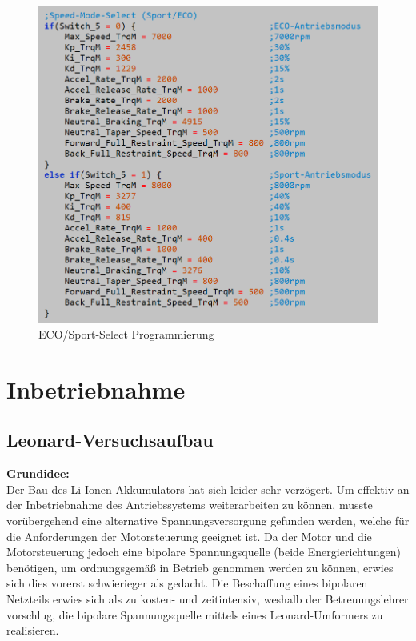 \begin{figure}[H]
	\begin{center}
		\includegraphics[scale=0.5]{figures/antrieb/ECO_Sport_Select_Programmschnippsel.png}
		\caption{ECO/Sport-Select Programmierung}
	\end{center}
\end{figure}

\newpage


\section{Inbetriebnahme}
\subsection{Leonard-Versuchsaufbau}
\textbf{Grundidee:}
\\[2mm]
Der Bau des Li-Ionen-Akkumulators hat sich leider sehr verzögert. Um effektiv an der Inbetriebnahme des Antriebssystems weiterarbeiten zu können, musste vorübergehend eine alternative Spannungsversorgung gefunden werden, welche für die Anforderungen der Motorsteuerung geeignet ist. Da der Motor und die Motorsteuerung jedoch eine bipolare Spannungsquelle (beide Energierichtungen) benötigen, um ordnungsgemäß in Betrieb genommen werden zu können, erwies sich dies vorerst schwierieger als gedacht. Die Beschaffung eines bipolaren Netzteils erwies sich als zu kosten- und zeitintensiv, weshalb der Betreuungslehrer vorschlug, die bipolare Spannungsquelle mittels eines Leonard-Umformers zu realisieren.

